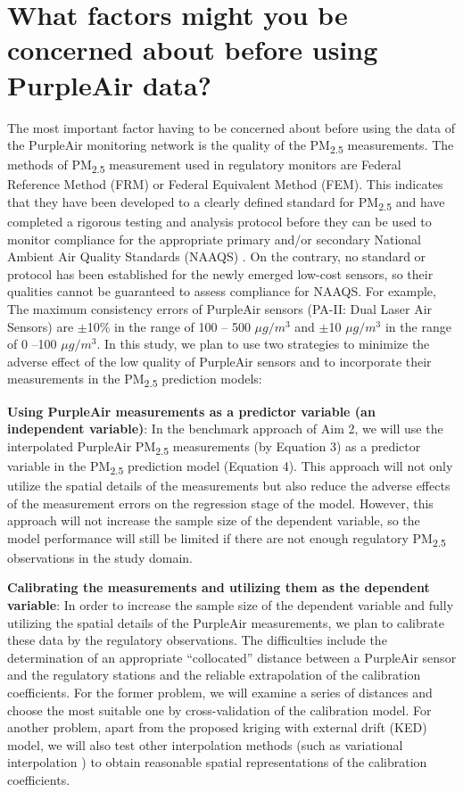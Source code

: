 \documentclass[11pt]{article}
\newcommand{\tsub}{\textsubscript}
\begin{document}
\section{What factors might you be concerned about before using PurpleAir data?}
The most important factor having to be concerned about before using the data of the PurpleAir monitoring network is the quality of the PM\tsub{2.5} measurements. The methods of PM\tsub{2.5} measurement used in regulatory monitors are Federal Reference Method (FRM) or Federal Equivalent Method (FEM). This indicates that they have been developed to a clearly defined standard for PM\tsub{2.5} and have completed a rigorous testing and analysis protocol before they can be used to monitor compliance for the appropriate primary and/or secondary National Ambient Air Quality Standards (NAAQS) \citep{hall2014integrating}. On the contrary, no standard or protocol has been established for the newly emerged low-cost sensors, so their qualities cannot be guaranteed to assess compliance for NAAQS. For example, The maximum consistency errors of PurpleAir sensors (PA-II: Dual Laser Air Sensors) are $\pm$10\% in the range of 100 -- 500 $\mu g/m^3$ and $\pm$10 $\mu g/m^3$ in the range of 0 --100 $\mu g/m^3$. In this study, we plan to use two strategies to minimize the adverse effect of the low quality of PurpleAir sensors and to incorporate their measurements in the PM\tsub{2.5} prediction models:
\begin{enumerate*}[{[1)]}]
    \item \textbf{Using PurpleAir measurements as a predictor variable (an independent variable)}: In the benchmark approach of Aim 2, we will use the interpolated PurpleAir PM\tsub{2.5} measurements (by Equation 3) as a predictor variable in the PM\tsub{2.5} prediction model (Equation 4). This approach will not only utilize the spatial details of the measurements but also reduce the adverse effects of the measurement errors on the regression stage of the model. However, this approach will not increase the sample size of the dependent variable, so the model performance will still be limited if there are not enough regulatory PM\tsub{2.5} observations in the study domain. 
    \item \textbf{Calibrating the measurements and utilizing them as the dependent variable}: In order to increase the sample size of the dependent variable and fully utilizing the spatial details of the PurpleAir measurements, we plan to calibrate these data by the regulatory observations. The difficulties include the determination of an appropriate ``collocated'' distance between a PurpleAir sensor and the regulatory stations and the reliable extrapolation of the calibration coefficients. For the former problem, we will examine a series of distances and choose the most suitable one by cross-validation of the calibration model. For another problem, apart from the proposed kriging with external drift (KED) model, we will also test other interpolation methods (such as variational interpolation \citep{turk1999shape}) to obtain reasonable spatial representations of the calibration coefficients. 
\end{enumerate*}
\end{document}
